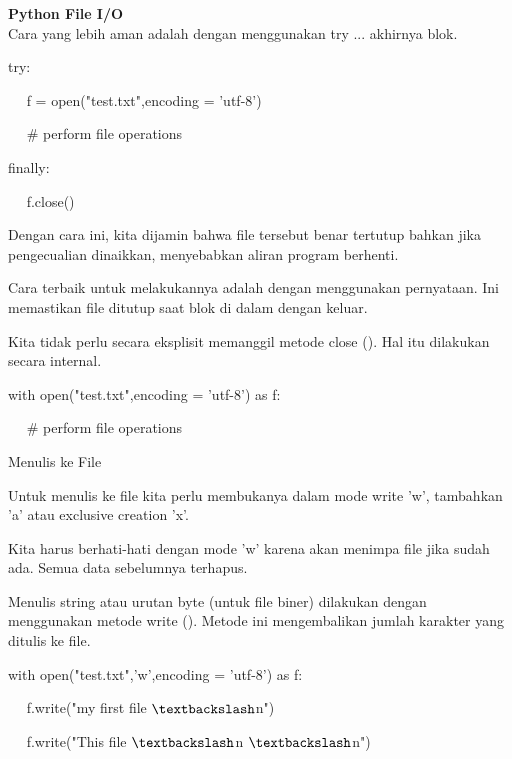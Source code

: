 \begin{center}{\fontsize{24pt}{24pt}\selectfont \textbf{Python File I/O} \\}
Cara yang lebih aman adalah dengan menggunakan try ... akhirnya blok. 
\vspace{12pt}

try: 

~~ f = open("test.txt",encoding = 'utf-8') 

~~  $  \#  $ perform file operations 

finally: 

~~ f.close() 
\vspace{12pt}

Dengan cara ini, kita dijamin bahwa file tersebut benar tertutup bahkan jika pengecualian dinaikkan, menyebabkan aliran program berhenti. 
\vspace{12pt}

Cara terbaik untuk melakukannya adalah dengan menggunakan pernyataan. Ini memastikan file ditutup saat blok di dalam dengan keluar. 
\vspace{12pt}

Kita tidak perlu secara eksplisit memanggil metode close (). Hal itu dilakukan secara internal. 
\vspace{12pt}

with open("test.txt",encoding = 'utf-8') as f:

~~  $  \#  $ perform file operations 
\vspace{12pt}
\vspace{12pt}
\vspace{12pt}
\vspace{12pt}

Menulis ke File 
\vspace{12pt}
 
Untuk menulis ke file kita perlu membukanya dalam mode write 'w', tambahkan 'a' atau exclusive creation 'x'. 
\vspace{12pt}

Kita harus berhati-hati dengan mode 'w' karena akan menimpa file jika sudah ada. Semua data sebelumnya terhapus. 
\vspace{12pt}

Menulis string atau urutan byte (untuk file biner) dilakukan dengan menggunakan metode write (). Metode ini mengembalikan jumlah karakter yang ditulis ke file. 
\vspace{12pt}

with open("test.txt",'w',encoding = 'utf-8') as f: 

~~ f.write("my first file $  \textbackslash  $n") 

~~ f.write("This file $  \textbackslash  $n $  \textbackslash  $n") 


\end{center}
